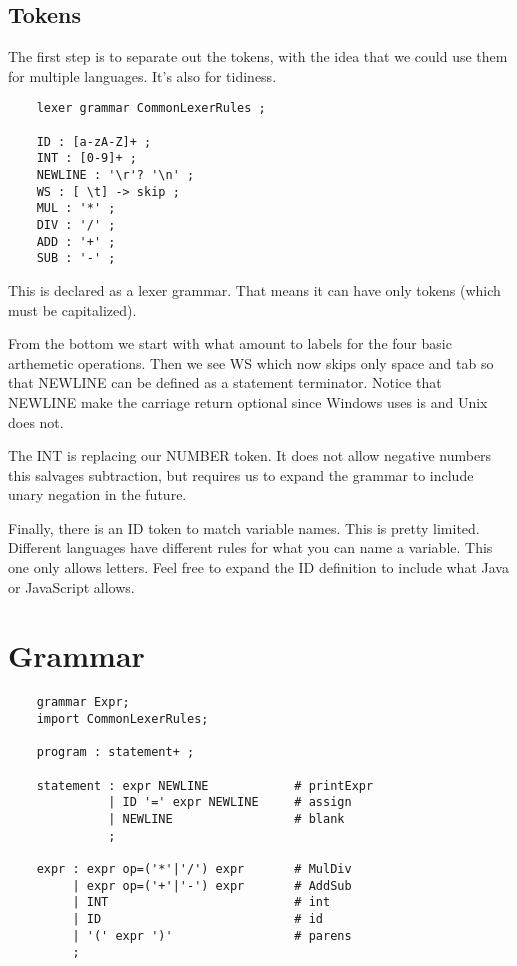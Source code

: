 \subsection{Tokens}

The first step is to separate out the tokens, with the idea that
we could use them for multiple languages. It's also for tidiness.

{\footnotesize
\begin{verbatim}
    lexer grammar CommonLexerRules ;

    ID : [a-zA-Z]+ ;
    INT : [0-9]+ ;
    NEWLINE : '\r'? '\n' ;
    WS : [ \t] -> skip ;
    MUL : '*' ;
    DIV : '/' ;
    ADD : '+' ;
    SUB : '-' ;
\end{verbatim}
}

This is declared as a lexer grammar. That means it can have only
tokens (which must be capitalized).

From the bottom we start with what amount to labels for the four
basic arthemetic operations. Then we see WS which now skips only space and tab
so that NEWLINE can be defined as a statement terminator. Notice
that NEWLINE make the carriage return optional since Windows uses
is and Unix does not.

The INT is replacing our NUMBER token. It does not allow negative
numbers this salvages subtraction, but requires us to expand
the grammar to include unary negation in the future.

Finally, there is an ID token to match variable names. This is
pretty limited. Different languages have different rules for what
you can name a variable. This one only allows letters. Feel free
to expand the ID definition to include what Java or JavaScript allows.

\section{Grammar}

{\footnotesize
\begin{verbatim}
    grammar Expr;
    import CommonLexerRules;
    
    program : statement+ ;
    
    statement : expr NEWLINE            # printExpr
              | ID '=' expr NEWLINE     # assign
              | NEWLINE                 # blank
              ;
    
    expr : expr op=('*'|'/') expr       # MulDiv
         | expr op=('+'|'-') expr       # AddSub
         | INT                          # int
         | ID                           # id
         | '(' expr ')'                 # parens
         ;
\end{verbatim}
}

